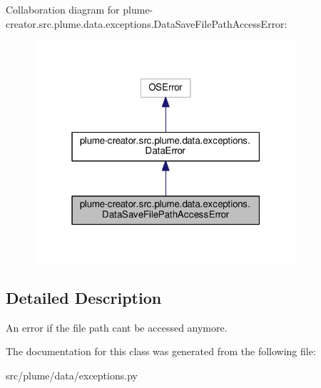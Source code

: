 Collaboration diagram for plume-\/creator.src.\+plume.\+data.\+exceptions.\+Data\+Save\+File\+Path\+Access\+Error\+:
\nopagebreak
\begin{figure}[H]
\begin{center}
\leavevmode
\includegraphics[width=277pt]{classplume-creator_1_1src_1_1plume_1_1data_1_1exceptions_1_1_data_save_file_path_access_error__coll__graph}
\end{center}
\end{figure}


\subsection{Detailed Description}
An error if the file path can\textquotesingle{}t be accessed anymore. 

The documentation for this class was generated from the following file\+:\begin{DoxyCompactItemize}
\item 
src/plume/data/exceptions.\+py\end{DoxyCompactItemize}
